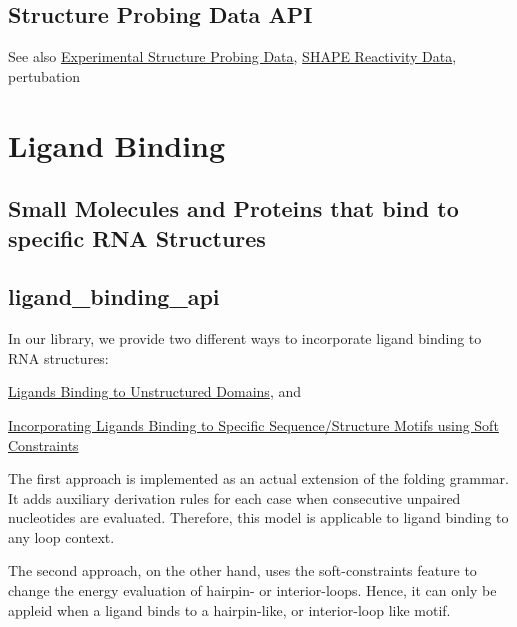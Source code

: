\hypertarget{structure_probing_data_structure_probing_api}{}\subsection{Structure Probing Data A\+PI}\label{structure_probing_data_structure_probing_api}
\begin{DoxySeeAlso}{See also}
\hyperlink{group__probing__data}{Experimental Structure Probing Data}, \hyperlink{group__SHAPE__reactivities}{S\+H\+A\+PE Reactivity Data}, pertubation
\end{DoxySeeAlso}
 \hypertarget{ligand_binding}{}\section{Ligand Binding}\label{ligand_binding}
\hypertarget{ligand_binding_ligand_binding_intro}{}\subsection{Small Molecules and Proteins that bind to specific R\+N\+A Structures}\label{ligand_binding_ligand_binding_intro}
\hypertarget{ligand_binding_ligand_binding_api}{}\subsection{ligand\+\_\+binding\+\_\+api}\label{ligand_binding_ligand_binding_api}
In our library, we provide two different ways to incorporate ligand binding to R\+NA structures\+:


\begin{DoxyItemize}
\item \hyperlink{group__ligands__up}{Ligands Binding to Unstructured Domains}, and
\item \hyperlink{group__constraints__ligand}{Incorporating Ligands Binding to Specific Sequence/\+Structure Motifs using Soft Constraints}
\end{DoxyItemize}

The first approach is implemented as an actual extension of the folding grammar. It adds auxiliary derivation rules for each case when consecutive unpaired nucleotides are evaluated. Therefore, this model is applicable to ligand binding to any loop context.

The second approach, on the other hand, uses the soft-\/constraints feature to change the energy evaluation of hairpin-\/ or interior-\/loops. Hence, it can only be appleid when a ligand binds to a hairpin-\/like, or interior-\/loop like motif.

